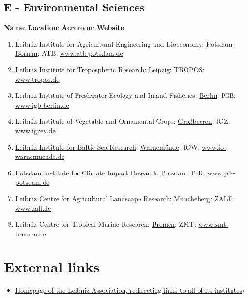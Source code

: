 \documentclass{book}
\numberwithin{equation}{section}
\begin{document}
\subsection{E - Environmental Sciences}
\textbf{Name}: \textbf{Location}: \textbf{Acronym}: \textbf{Website}
\begin{enumerate}
    \item Leibniz Institute for Agricultural Engineering and Bioeconomy: \href{https://en.wikipedia.org/wiki/Potsdam}{Potsdam-Bornim}: ATB: \url{www.atb-potsdam.de}
    \item \href{https://en.wikipedia.org/wiki/Leibniz_Institute_for_Tropospheric_Research}{Leibniz Institute for Tropospheric Research}: \href{https://en.wikipedia.org/wiki/Leipzig}{Leipzig}: TROPOS: \url{www.tropos.de}
    \item Leibniz Institute of Freshwater Ecology and Inland Fisheries: \href{https://en.wikipedia.org/wiki/Berlin}{Berlin}: IGB: \url{www.igb-berlin.de}
    \item Leibniz Institute of Vegetable and Ornamental Crops: \href{https://en.wikipedia.org/wiki/Gro%C3%9Fbeeren}{Großbeeren}: IGZ: \url{www.igzev.de}
    \item \href{https://en.wikipedia.org/wiki/Leibniz_Institute_for_Baltic_Sea_Research}{Leibniz Institute for Baltic Sea Research}: \href{https://en.wikipedia.org/wiki/Warnem%C3%BCnde}{Warnemünde}: IOW: \url{www.io-warnemuende.de}
    \item \href{https://en.wikipedia.org/wiki/Potsdam_Institute_for_Climate_Impact_Research}{Potsdam Institute for Climate Impact Research}: \href{https://en.wikipedia.org/wiki/Potsdam}{Potsdam}: PIK: \url{www.pik-potsdam.de}
    \item Leibniz Centre for Agricultural Landscape Research: \href{https://en.wikipedia.org/wiki/M%C3%BCncheberg}{Müncheberg}: ZALF: \url{www.zalf.de}
    \item Leibniz Centre for Tropical Marine Research: \href{https://en.wikipedia.org/wiki/Bremen}{Bremen}: ZMT: \url{www.zmt-bremen.de}
\end{enumerate}

\section{External links}
\begin{itemize}
    \item \href{http://www.leibniz-association.eu/}{Homepage of the Leibniz Association, redirecting links to all of its institutes}\hfill$\square$
\end{itemize}
\end{document}
